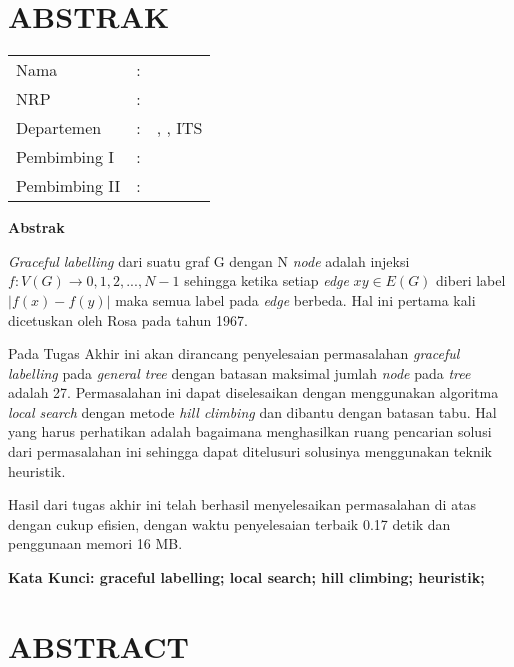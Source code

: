 \chapter {ABSTRAK}


\noindent\textbf{\MakeUppercase\judul}
\vspace*{1em}

\begin{tabularx}{\linewidth}{ l l X }
	Nama 			& : & \penulis \\
	NRP 			& :	& \nrp \\
	Departemen 		& : & \jurusan, \newline \fakultas, ITS \\
	Pembimbing I 	& : & \pembimbingsatu \\
	Pembimbing II 	& : & \pembimbingdua
	\vspace*{1em} 	%
\end {tabularx}

\noindent\textbf{Abstrak} \\
\itshape
\par \textit{Graceful labelling} dari suatu graf G dengan N \textit{node} adalah injeksi $ f : V(G) \rightarrow {0,1,2,...,N-1} $ sehingga ketika setiap \textit{edge} $ xy \in E(G) $ diberi label $ | f(x) - f(y) | $ maka semua label pada \textit{edge} berbeda. Hal ini pertama kali dicetuskan oleh Rosa pada tahun 1967.
\par Pada Tugas Akhir ini akan dirancang penyelesaian permasalahan \textit{graceful labelling} pada \textit{general tree} dengan batasan maksimal jumlah \textit{node} pada \textit{tree} adalah 27. Permasalahan ini dapat diselesaikan dengan menggunakan algoritma \textit{local search} dengan metode \textit{hill climbing} dan dibantu dengan batasan tabu. Hal yang harus perhatikan adalah bagaimana menghasilkan ruang pencarian solusi dari permasalahan ini sehingga dapat ditelusuri solusinya menggunakan teknik heuristik.
\par Hasil dari tugas akhir ini telah berhasil menyelesaikan permasalahan di atas dengan cukup efisien, dengan waktu penyelesaian terbaik 0.17 detik dan penggunaan memori 16 MB.


\vspace*{1em}
\noindent\bfseries Kata Kunci: graceful labelling; local search; hill climbing; heuristik;
\normalfont
\cleardoublepage

\chapter {ABSTRACT}
\noindent\textbf{\MakeUppercase\juduleng}
\vspace*{1em}

